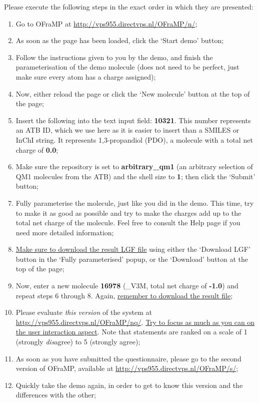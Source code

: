 Please execute the following steps in the exact order in which they are presented:
\begin{enumerate}
\item Go to OFraMP at \url{http://vps955.directvps.nl/OFraMP/n/};
\item As soon as the page has been loaded, click the `Start demo' button;
\item Follow the instructions given to you by the demo, and finish the parameterisation of the demo molecule (does not need to be perfect, just make sure every atom has a charge assigned);
\item Now, either reload the page or click the `New molecule' button at the top of the page;
\item Insert the following into the text input field: \textbf{10321}. This number represents an ATB ID, which we use here as it is easier to insert than a SMILES or InChI string. It represents 1,3-propandiol (PDO), a molecule with a total net charge of \textbf{0.0};
\item Make sure the repository is set to \textbf{arbitrary\_qm1} (an arbitrary selection of QM1 molecules from the ATB) and the shell size to \textbf{1}; then click the `Submit' button;
\item Fully parameterise the molecule, just like you did in the demo. This time, try to make it as good as possible and try to make the charges add up to the total net charge of the molecule. Feel free to consult the Help page if you need more detailed information;
\item \underline{Make sure to download the result LGF file} using either the `Download LGF' button in the `Fully parameterised' popup, or the `Download' button at the top of the page;
\item Now, enter a new molecule \textbf{16978} (\_V3M, total net charge of \textbf{-1.0}) and repeat steps 6 through 8. Again, \underline{remember to download the result file};
\item Please evaluate \emph{this version} of the system at \url{http://vps955.directvps.nl/OFraMP/nq/}. \underline{Try to focus as much as you can on the user interaction aspect}. Note that statements are ranked on a scale of 1 (strongly \emph{dis}agree) to 5 (strongly agree);
\item As soon as you have submitted the questionnaire, please go to the second version of OFraMP, available at \url{http://vps955.directvps.nl/OFraMP/s/};
\item Quickly take the demo again, in order to get to know this version and the differences with the other;

\end{enumerate}
